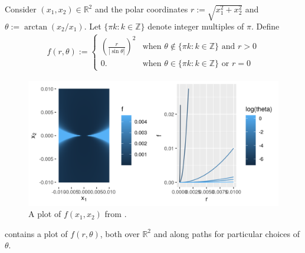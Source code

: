 \begin{ex}
%
Consider $(x_1, x_2) \in \mathbb{R}^2$ and the polar coordinates $r :=
\sqrt{x_1^2 + x_2^2}$ and $\theta := \arctan(x_2 / x_1)$.  Let $\{\pi k: k \in
\mathbb{Z} \}$ denote integer multiples of $\pi$.  Define
%
\begin{align*}
%
f(r, \theta) := \begin{cases}
    \left(\frac{r}{| \sin \theta |}\right)^2
        & \textrm{when } \theta \notin \{\pi k: k \in \mathbb{Z}\}
        \textrm{ and } r > 0 \\
    0. & \textrm{when } \theta \in \{\pi k: k \in \mathbb{Z}
        \} \textrm{ or }r = 0
%
\end{cases}
%
\end{align*}
%
\begin{figure}[h!]

\includegraphics[width=0.980\linewidth,height=0.490\linewidth]{static_images/pathological_r2_example.png}
\caption{A plot of $f(x_1, x_2)$ from .}
\centering
\end{figure}
%
 contains a plot of $f(r, \theta)$, both over
$\mathbb{R}^2$ and along paths for particular choices of $\theta$.


\end{ex}
